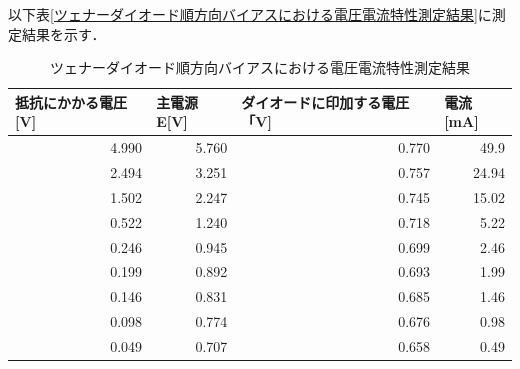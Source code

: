 \documentclass[titlepage]{jarticle}
\begin{document}
以下表\ref{ツェナーダイオード順方向バイアスにおける電圧電流特性測定結果}に測定結果を示す．

\begin{table}[htbp]
    \caption{ツェナーダイオード順方向バイアスにおける電圧電流特性測定結果}
    \begin{center}
        \begin{tabular}{r|r|r|r}
            \hline\hline
            \multicolumn{1}{l|}{抵抗にかかる電圧[V]} & \multicolumn{1}{l|}{主電源E[V]} & \multicolumn{1}{l|}{ダイオードに印加する電圧「V]} & \multicolumn{1}{l}{電流[mA]} \\ \hline
            4.990                                    & 5.760                           & 0.770                                             & 49.9                         \\ \hline
            2.494                                    & 3.251                           & 0.757                                             & 24.94                        \\ \hline
            1.502                                    & 2.247                           & 0.745                                             & 15.02                        \\ \hline
            0.522                                    & 1.240                           & 0.718                                             & 5.22                         \\ \hline
            0.246                                    & 0.945                           & 0.699                                             & 2.46                         \\ \hline
            0.199                                    & 0.892                           & 0.693                                             & 1.99                         \\ \hline
            0.146                                    & 0.831                           & 0.685                                             & 1.46                         \\ \hline
            0.098                                    & 0.774                           & 0.676                                             & 0.98                         \\ \hline
            0.049                                    & 0.707                           & 0.658                                             & 0.49                         \\ \hline

\end{tabular}
\end{center}
\end{table}
\end{document}
